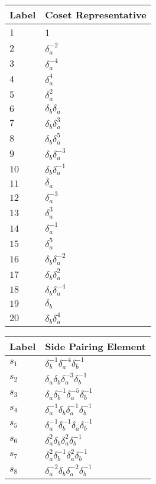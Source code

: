 \documentclass{article}
\begin{document}
\begin{center}
\begin{tabular}{ll}
\toprule
Label & Coset Representative\\
\midrule
$1$ & 1 \\
$2$ & $\delta_a^{-2}$ \\
$3$ & $\delta_a^{-4}$ \\
$4$ & $\delta_a^{4}$ \\
$5$ & $\delta_a^{2}$ \\
$6$ & $\delta_b^{}\delta_a^{}$ \\
$7$ & $\delta_b^{}\delta_a^{3}$ \\
$8$ & $\delta_b^{}\delta_a^{5}$ \\
$9$ & $\delta_b^{}\delta_a^{-3}$ \\
$10$ & $\delta_b^{}\delta_a^{-1}$ \\
$11$ & $\delta_a^{}$ \\
$12$ & $\delta_a^{-3}$ \\
$13$ & $\delta_a^{3}$ \\
$14$ & $\delta_a^{-1}$ \\
$15$ & $\delta_a^{5}$ \\
$16$ & $\delta_b^{}\delta_a^{-2}$ \\
$17$ & $\delta_b^{}\delta_a^{2}$ \\
$18$ & $\delta_b^{}\delta_a^{-4}$ \\
$19$ & $\delta_b^{}$ \\
$20$ & $\delta_b^{}\delta_a^{4}$ \\
\bottomrule
\end{tabular}
\hfill
\begin{tabular}{ll}
\toprule
Label & Side Pairing Element\\
\midrule
$s_{1}$ & $\delta_b^{-1}\delta_a^{-4}\delta_b^{-1}$ \\
$s_{2}$ & $\delta_a^{}\delta_b^{}\delta_a^{-3}\delta_b^{-1}$ \\
$s_{3}$ & $\delta_a^{}\delta_b^{-1}\delta_a^{-5}\delta_b^{-1}$ \\
$s_{4}$ & $\delta_a^{-1}\delta_b^{}\delta_a^{-1}\delta_b^{-1}$ \\
$s_{5}$ & $\delta_a^{-1}\delta_b^{-1}\delta_a^{}\delta_b^{-1}$ \\
$s_{6}$ & $\delta_a^{2}\delta_b^{}\delta_a^{2}\delta_b^{-1}$ \\
$s_{7}$ & $\delta_a^{2}\delta_b^{-1}\delta_a^{2}\delta_b^{-1}$ \\
$s_{8}$ & $\delta_a^{-2}\delta_b^{}\delta_a^{-2}\delta_b^{-1}$ \\

\end{tabular}
\end{center}
\end{document}
